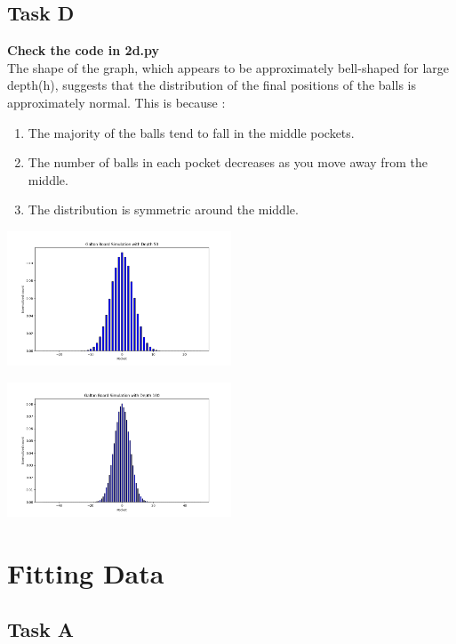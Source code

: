 \documentclass[12pt]{article}
\begin{document}
\subsection{Task D}
\textbf{Check the code in 2d.py} \\
The shape of the graph, which appears to be approximately bell-shaped for large depth(h), suggests that the distribution of the final positions of the balls is approximately normal.
\newline
This is because :
\begin{enumerate}
    \item The majority of the balls tend to fall in the middle pockets.
    \item The number of balls in each pocket decreases as you move away from the middle.
    \item The distribution is symmetric around the middle.
\end{enumerate}
\begin{minipage}{\linewidth}
    \begin{center}
        \includegraphics[width=0.5\textwidth]{images/2d2.png}
    \end{center}
\end{minipage}
\begin{minipage}{\linewidth}
    \begin{center}
        \includegraphics[width=0.5\textwidth]{images/2d3.png}
    \end{center}
\end{minipage}

\section{Fitting Data}
\subsection{Task A}
\end{document}

